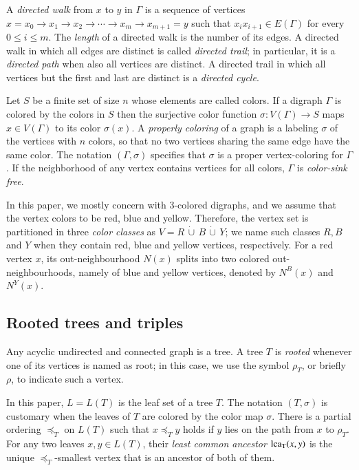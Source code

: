 \documentclass[final,3p,times]{elsarticle}
\begin{document}
A \emph{directed walk} from $x$ to $y$ in $\Gamma$ is a sequence of vertices $x=x_0\rightarrow x_1 \rightarrow x_2 \rightarrow \cdots\rightarrow x_m \rightarrow x_{m+1}=y $ such that $x_ix_{i+1}\in E(\Gamma)$ for every $0\le i \le m$. The \emph{length} of a directed walk is the number of its edges. A directed walk in which all edges are distinct is called \emph{directed trail}; in particular, it is a \emph{directed path} when also all vertices are distinct. A directed trail in which all vertices but the first and last are distinct is a \emph{directed cycle}. 

Let $S$ be a finite set of size $n$ whose elements are called colors. If a digraph $\Gamma$ is colored by the colors in $S$ then the surjective color function $\sigma: V(\Gamma)\rightarrow S$ maps $x\in V(\Gamma)$ to its color $\sigma(x)$. A \emph{properly coloring} of a graph is a labeling $\sigma$ of the vertices with $n$ colors, so that no two vertices sharing the same edge have the same color. The notation $(\Gamma,\sigma)$ specifies that $\sigma$ is a proper vertex-coloring for $\Gamma$. If the neighborhood of any vertex contains vertices for all colors, $\Gamma$ is \emph{color-sink free}. 

In this paper, we mostly concern with 3-colored digraphs, and we assume that the vertex colors to be red, blue and yellow. Therefore, the vertex set is partitioned in three \emph{color classes} as $V=R\,\dot{\cup}\, B\,\dot{\cup}\, Y$; we name such classes $R,B$ and $Y$ when they contain red, blue and yellow vertices, respectively. For a red vertex $x$, its out-neighbourhood $N(x)$ splits into two colored out-neighbourhoods, namely of blue and yellow vertices, denoted by $N^{B}(x)$ and $N^{Y}(x)$. 

\subsection{Rooted trees and triples}
Any acyclic undirected and connected graph is a tree. A tree $T$ is \emph{rooted} whenever one of its vertices is named as root; in this case, we use the symbol $\rho_T$, or briefly $\rho$, to indicate such a vertex.  

In this paper, $L=L(T)$ is the leaf set of a tree $T$. The notation $(T,\sigma)$ is customary when the leaves of $T$ are colored by the color map $\sigma$. There is a partial ordering $\preceq_T$ on $L(T)$ such that $x\preceq_T y$ holds if $y$ lies on the path from $x$ to $\rho_T$. For any two leaves $x,y\in L(T)$, their \emph{least common ancestor} ${\rm{lca_T}}(x,y)$ is the unique $\preceq_T$-smallest vertex that is an ancestor of both of them.
\end{document}
